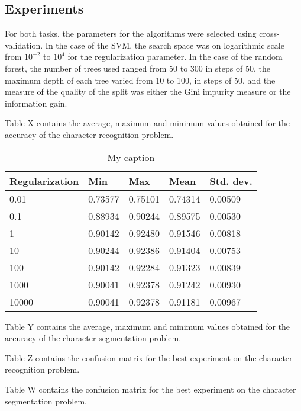 \subsection{Experiments}

For both tasks, the parameters for the algorithms were selected using cross-validation. In the case of the SVM, the search space was on logarithmic scale from $10^{-2}$ to $10^4$ for the regularization parameter. In the case of the random forest, the number of trees used ranged from 50 to 300 in steps of 50, the maximum depth of each tree varied from 10 to 100, in steps of 50, and the measure of the quality of the split was either the Gini impurity measure or the information gain. 

Table X contains the average, maximum and minimum values obtained for the accuracy of the character recognition problem.

\begin{table}[h]
\caption{My caption}
\label{my-label}
\begin{tabular}{lllll}
\hline
Regularization & Min     & Max     & Mean    & Std. dev. \\ \hline
0.01           & 0.73577 & 0.75101 & 0.74314 & 0.00509   \\
0.1            & 0.88934 & 0.90244 & 0.89575 & 0.00530   \\
1              & 0.90142 & 0.92480 & 0.91546 & 0.00818   \\
10             & 0.90244 & 0.92386 & 0.91404 & 0.00753   \\
100            & 0.90142 & 0.92284 & 0.91323 & 0.00839   \\
1000           & 0.90041 & 0.92378 & 0.91242 & 0.00930   \\
10000          & 0.90041 & 0.92378 & 0.91181 & 0.00967   \\ \hline
\end{tabular}
\end{table}

Table Y contains the average, maximum and minimum values obtained for the accuracy of the character segmentation problem.

Table Z contains the confusion matrix for the best experiment on the character recognition problem.

Table W contains the confusion matrix for the best experiment on the character segmentation problem.
